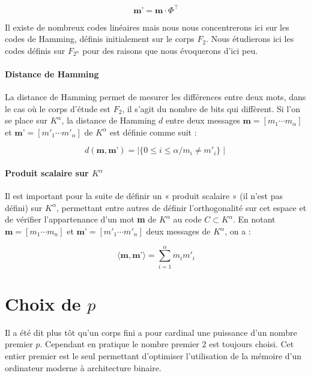 \documentclass[10pt]{article}
\begin{document}
\begin{displaymath}
\textbf{m'}= \textbf{m} \cdot \Phi^{\intercal}
\end{displaymath}

Il existe de nombreux codes linéaires mais nous nous concentrerons ici sur les codes de Hamming, définis initialement sur le corps $F_{2}$. Nous étudierons ici les codes définis sur $F_{2^{\alpha}}$ pour des raisons que nous évoquerons d'ici peu.

\paragraph{Distance de Hamming}
La distance de Hamming permet de mesurer les différences entre deux mots, dans le cas où le corps d'étude est $F_{2}$, il s'agit du nombre de bits qui diffèrent. Si l'on se place sur $K^{\alpha}$, la distance de Hamming $d$ entre deux messages $\textbf{m}=[ m_1 \cdots m_{\alpha} ] $ et $\textbf{m'}=[ m'_1 \cdots m'_{\alpha} ] $ de $K^{\alpha}$ est définie comme suit :

\begin{displaymath}
d(\textbf{m},\textbf{m'})=\mid \lbrace 0\leq i \leq \alpha / m_i \neq m'_i \rbrace \mid
\end{displaymath}


\paragraph{Produit scalaire sur $K^{\alpha}$}
Il est important pour la suite de définir un « produit scalaire » (il n'est pas défini) sur $K^{\alpha}$, permettant entre autres de définir l'orthogonalité sur cet espace et de vérifier l'appartenance d'un mot \textbf{m} de $K^{\alpha}$ au code $C \subset K^{\alpha}$. En notant $\textbf{m}=[ m_1 \cdots m_n ] $ et $\textbf{m'}=[ m'_1 \cdots m'_n ] $ deux messages de $K^{\alpha}$, on a :

\begin{equation}
\langle \textbf{m}, \textbf{m'} \rangle = \sum_{i=1}^{\alpha} m_i m'_i
\end{equation}



\section{Choix de $p$}
Il a été dit plus tôt qu'un corps fini a pour cardinal une puissance d'un nombre premier $p$. Cependant en pratique le nombre premier 2 est toujours choisi. Cet entier premier est le seul permettant d'optimiser l'utilisation de la mémoire d'un ordinateur moderne à architecture binaire.
\end{document}
